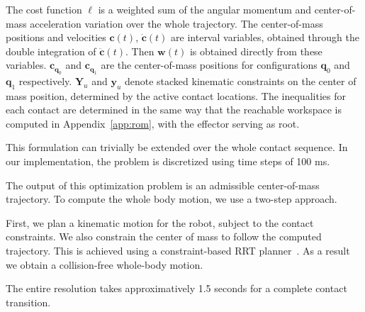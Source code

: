 The cost function $\ell$ is a weighted sum of the angular momentum and center-of-mass acceleration variation over the whole trajectory.
The center-of-mass positions and velocities $\mathbf{c}(t)$, $\mathbf{\dot{c}}(t)$ are interval variables, obtained through the double integration of $\mathbf{\ddot{c}}(t)$.
Then $\mathbf{w}(t)$ is obtained directly from these variables. $\mathbf{c}_{\mathbf{q}_0}$ and $\mathbf{c}_{\mathbf{q}_1}$ are the center-of-mass positions for configurations
 $\mathbf{q}_0$ and $\mathbf{q}_1$ respectively.
$\mathbf{Y}_u$ and $\mathbf{y}_u$ denote stacked kinematic constraints on the center of mass position, determined by the active contact locations.
The inequalities for each contact are determined in the same way that the reachable workspace is computed in Appendix~\ref{app:rom}, with
the effector serving as root. %

This formulation can trivially be extended over the whole contact sequence.
In our implementation, the problem is discretized using time steps of 100 ms. 

The output of this optimization problem is an admissible center-of-mass trajectory.
To compute the whole body motion, we use a two-step approach.

First, we plan a kinematic motion for the robot, subject to the contact constraints. We also constrain the center of mass to follow
the computed trajectory. This is achieved using a constraint-based RRT planner~\citep{7759083}. As a result we obtain a collision-free whole-body motion.

The entire resolution takes approximatively 1.5 seconds for a complete contact transition.

